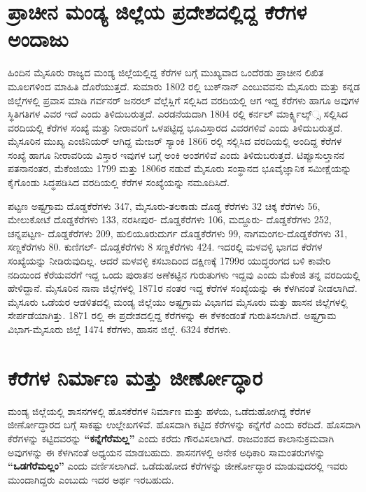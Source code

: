 \section{ಪ್ರಾಚೀನ ಮಂಡ್ಯ ಜಿಲ್ಲೆಯ ಪ್ರದೇಶದಲ್ಲಿದ್ದ ಕೆರೆಗಳ ಅಂದಾಜು}

ಹಿಂದಿನ ಮೈಸೂರು ರಾಜ್ಯದ ಮಂಡ್ಯ ಜಿಲ್ಲೆಯಲ್ಲಿದ್ದ ಕೆರೆಗಳ ಬಗ್ಗೆ ಮುಖ್ಯವಾದ ಒಂದೆರಡು ಪ್ರಾಚೀನ ಲಿಖಿತ ಮೂಲಗಳಿಂದ ಮಾಹಿತಿ ದೊರೆಯುತ್ತದೆ. ಸುಮಾರು 1802 ರಲ್ಲಿ ಬುಕ್​ನಾನ್​ ಎಂಬುವವನು ಮೈಸೂರು ಮತ್ತು ಕನ್ನಡ ಜಿಲ್ಲೆಗಳಲ್ಲಿ ಪ್ರವಾಸ ಮಾಡಿ ಗರ್ವನರ್​ ಜನರಲ್​ ವೆಲ್ಲೆಸ್ಲಿಗೆ ಸಲ್ಲಿಸಿದ ವರದಿಯಲ್ಲಿ ಆಗ ಇದ್ದ ಕೆರೆಗಳು ಹಾಗೂ ಅವುಗಳ ಸ್ಥಿತಿಗತಿಗಳ ವಿವರ ಇದೆ ಎಂದು ತಿಳಿದುಬರುತ್ತದೆ. ಎರಡನೆಯದಾಗಿ 1804 ರಲ್ಲಿ ಕರ್ನಲ್​ ಮಾರ್ಕ್ಸ್ವಿಲ್ಕ್​್ಸ ಸಲ್ಲಿಸಿದ ವರದಿಯಲ್ಲಿ ಕೆರೆಗಳ ಸಂಖ್ಯೆ ಮತ್ತು ನೀರಾವರಿಗೆ ಒಳಪಟ್ಟಿದ್ದ ಭೂವಿಸ್ತಾರದ ವಿವರಗಳಿವೆ ಎಂದು ತಿಳಿದುಬರುತ್ತದೆ. ಮೈಸೂರಿನ ಮುಖ್ಯ ಎಂಜಿನಿಯರ್​ ಆಗಿದ್ದ ಮೇಜರ್​ ಸ್ಯಾಂಕಿ 1866 ರಲ್ಲಿ ಸಲ್ಲಿಸಿದ ವರದಿಯಲ್ಲಿ ಅಂದಿದ್ದ ಕೆರೆಗಳ ಸಂಖ್ಯೆ ಹಾಗೂ ನೀರಾವರಿಯ ವಿಸ್ತಾರ ಇವುಗಳ ಬಗ್ಗೆ ಅಂಕಿ ಅಂಶಗಳಿವೆ ಎಂದು ತಿಳಿದುಬರುತ್ತದೆ. ಟಿಪ್ಪೂಸುಲ್ತಾನನ ಪತನಾನಂತರ, ಮೆಕೆಂಜಿಯು 1799 ಮತ್ತು 1806ರ ನಡುವೆ ಮೈಸೂರು ಸಂಸ್ಥಾನದ ಭೂವೈಜ್ಞಾನಿಕ ಸಮೀಕ್ಷೆಯನ್ನು ಕೈಗೊಂಡು ಸಿದ್ಧಪಡಿಸಿದ ವರದಿಯಲ್ಲಿ ಕೆರೆಗಳ ಸಂಖ್ಯೆಯನ್ನು ನಮೂದಿಸಿದೆ.

ಪಟ್ಟಣ ಅಷ್ಟಗ್ರಾಮ  ದೊಡ್ಡಕೆರೆಗಳು 347, ಮೈಸೂರು-ತಲಕಾಡು ದೊಡ್ಡ ಕೆರೆಗಳು 32 ಚಿಕ್ಕ ಕೆರೆಗಳು 56, ಮೇಲುಕೋಟೆ  ದೊಡ್ಡಕೆರೆಗಳು 133, ನರಸೀಪುರ- ದೊಡ್ಡಕೆರೆಗಳು 106, ಮದ್ದೂರು- ದೊಡ್ಡಕೆರೆಗಳು 252, ಚನ್ನಪಟ್ಟಣ- ದೊಡ್ಡಕೆರೆಗಳು 209, ಹುಲಿಯೂರುದುರ್ಗ ದೊಡ್ಡಕೆರೆಗಳು 99, ನಾಗಮಂಗಲ-ದೊಡ್ಡಕೆರೆಗಳು 31, ಸಣ್ಣಕೆರೆಗಳು 80. ಕುಣಿಗಲ್​- ದೊಡ್ಡಕೆರೆಗಳು 8 ಸಣ್ಣಕೆರೆಗಳು 424. ಇದರಲ್ಲಿ ಮಳವಳ್ಳಿ ಭಾಗದ ಕೆರೆಗಳ ಸಂಖ್ಯೆಯನ್ನು ನೀಡಿರುವುದಿಲ್ಲ. ಆದರೆ ಮಳವಳ್ಳಿ ಕಸಬಾದಿಂದ ದಕ್ಷಿಣಕ್ಕೆ 1799ರ ಯುದ್ಧರಂಗದ ಬಳಿ ಕಾವೇರಿ ನದಿಯಿಂದ ಕೆರೆಯವರೆಗೆ ಇದ್ದ ಒಂದು ಪುರಾತನ ಅಣೆಕಟ್ಟಿನ ಗುರುತುಗಳು ಇದ್ದವು ಎಂದು ಮೆಕೆಂಜಿ ತನ್ನ ವರದಿಯಲ್ಲಿ ಹೇಳಿದ್ದಾನೆ. ಮೈಸೂರಿನ ನಾನಾ ಜಿಲ್ಲೆಗಳಲ್ಲಿ 1871ರ ನಂತರ ಇದ್ದ ಕೆರೆಗಳ ಸಂಖ್ಯೆಯನ್ನು ಈ ಕೆಳಗಿನಂತೆ ನೀಡಲಾಗಿದೆ. ಮೈಸೂರು ಒಡೆಯರ ಆಡಳಿತದಲ್ಲಿ ಮಂಡ್ಯ ಜಿಲ್ಲೆಯು ಅಷ್ಟಗ್ರಾಮ ವಿಭಾಗದ ಮೈಸೂರು ಮತ್ತು ಹಾಸನ ಜಿಲ್ಲೆಗಳಲ್ಲಿ ಸೇರ್ಪಡೆಯಾಗಿತ್ತು. 1871 ರಲ್ಲಿ ಈ ಪ್ರದೇಶದಲ್ಲಿದ್ದ ಕೆರೆಗಳನ್ನು ಈ ಕೆಳಕಂಡಂತೆ ಗುರುತಿಸಲಾಗಿದೆ. ಅಷ್ಟಗ್ರಾಮ ವಿಭಾಗ-ಮೈಸೂರು ಜಿಲ್ಲೆ 1474 ಕೆರೆಗಳು, ಹಾಸನ ಜಿಲ್ಲೆ. 6324 ಕೆರೆಗಳು.


\section{ಕೆರೆಗಳ ನಿರ್ಮಾಣ ಮತ್ತು ಜೀರ್ಣೋದ್ಧಾರ}

ಮಂಡ್ಯ ಜಿಲ್ಲೆಯಲ್ಲಿ ಶಾಸನಗಳಲ್ಲಿ ಹೊಸಕೆರೆಗಳ ನಿರ್ಮಾಣ ಮತ್ತು ಹಳೆಯ, ಒಡೆದುಹೋಗಿದ್ದ ಕೆರೆಗಳ ಜೀರ್ಣೋದ್ಧಾರದ ಬಗ್ಗೆ ಸಾಕಷ್ಟು ಉಲ್ಲೇಖಗಳಿವೆ. ಹೊಸದಾಗಿ ಕಟ್ಟಿದ ಕೆರೆಗಳನ್ನು ಕನ್ನೆಗೆರೆ ಎಂದು ಕರೆದಿದೆ. ಹೊಸದಾಗಿ ಕೆರೆಗಳನ್ನು ಕಟ್ಟಿದವರನ್ನು \textbf{“ಕನ್ನೆಗೆರೆಮಲ್ಲ”} ಎಂದು ಕರೆದು ಗೌರವಿಸಲಾಗಿದೆ. ರಾಜವಂಶದ ಕಾಲಾನುಕ್ರಮವಾಗಿ ಅವುಗಳನ್ನು ಈ ಕೆಳಗಿನಂತೆ ಅಧ್ಯಯನ ಮಾಡಬಹುದು. ಶಾಸನಗಳಲ್ಲಿ ಅನೇಕ ಅಧಿಕಾರಿ ಸಾಮಂತರುಗಳನ್ನು \textbf{“ಒಡಗೆರೆಮಲ್ಲಂ”} ಎಂದು ವರ್ಣಿಸಲಾಗಿದೆ. ಒಡೆದುಹೋದ ಕೆರೆಗಳನ್ನು ಜೀರ್ಣೋದ್ಧಾರ ಮಾಡುವುದರಲ್ಲಿ ಇವರು ಮುಂದಾಗಿದ್ದರು ಎಂಬುದು ಇದರ ಅರ್ಥ ಇರಬಹುದು.

